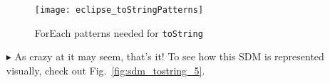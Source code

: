 \begin{itemize}
\begin{figure}[htp]
\begin{center}
  \texttt{[image: eclipse\_toStringPatterns]}
  \caption{ForEach patterns needed for \texttt{toString}}
  \label{fig:toStringPatterns}
\end{center}
\end{figure}

\vspace{0.5cm}

\item[$\blacktriangleright$] As crazy at it may seem, that's it!  To
see how this SDM is represented visually, check out Fig.~\ref{fig:sdm_tostring_5}.

\end{itemize}
